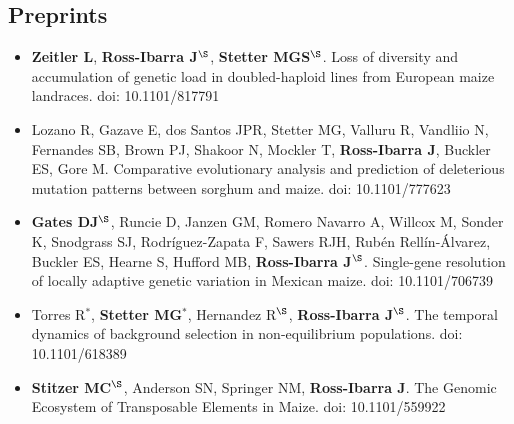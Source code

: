 \subsection*{Preprints}
\begin{itemize}

\item \textbf{Zeitler L}, \textbf{Ross-Ibarra J}$^\S$, \textbf{Stetter MGS}$^\S$.
Loss of diversity and accumulation of genetic load in doubled-haploid lines from European maize landraces. doi: 10.1101/817791

\item Lozano R, Gazave E, dos Santos JPR, Stetter MG, Valluru R, Vandliio N, Fernandes SB, Brown PJ, Shakoor N, Mockler T, \textbf{Ross-Ibarra J}, Buckler ES, Gore M. Comparative evolutionary analysis and prediction of deleterious mutation patterns between sorghum and maize. doi: 10.1101/777623

\item \textbf{Gates DJ}$^\S$, Runcie D, Janzen GM, Romero Navarro A,  Willcox M,  Sonder K, Snodgrass SJ, Rodr\'{i}guez-Zapata F,  Sawers RJH, Rub\'{e}n Rell\'{i}n-\'{A}lvarez, Buckler ES, Hearne S, Hufford MB, \textbf{Ross-Ibarra J}$^\S$. Single-gene resolution of locally adaptive genetic variation in Mexican maize. doi: 10.1101/706739

\item Torres R$^*$, \textbf{Stetter MG}$^*$, Hernandez R$^\S$, \textbf{Ross-Ibarra J}$^\S$. The temporal dynamics of background selection in non-equilibrium populations. doi: 10.1101/618389

\item \textbf{Stitzer MC}$^\S$, Anderson SN, Springer NM, \textbf{Ross-Ibarra J}. The Genomic Ecosystem of Transposable Elements in Maize. doi: 10.1101/559922



\end{itemize}


